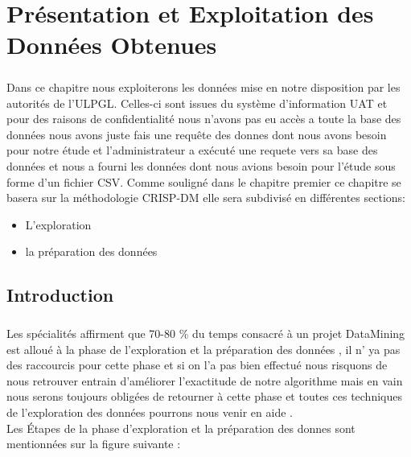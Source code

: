 \chapter{Présentation et Exploitation des Données Obtenues}
\paragraph{}
 Dans ce chapitre nous exploiterons  les données mise en notre
disposition par les autorités de l'\ac{ULPGL}. Celles-ci sont issues du
système d'information \ac{UAT}  et pour des
raisons de confidentialité nous n'avons pas eu accès a toute la base des
données nous avons juste fais une requête des donnes dont nous avons
besoin pour notre étude et l'administrateur a exécuté une requete vers
sa base des données et nous a fourni les données dont nous avions besoin
pour l'étude sous forme d'un fichier \ac {CSV}. Comme
souligné dans le chapitre premier ce chapitre se basera sur la
méthodologie \ac{CRISP-DM} elle sera subdivisé en différentes sections:
\begin{itemize}
	\item L'exploration 
	\item la préparation des données \cite{bookSckit-Learn}
\end{itemize}


    \section{Introduction}
\paragraph{}
Les spécialités affirment que 70-80 \% du temps consacré à un projet
DataMining est alloué à la phase de l'exploration et la préparation des
données \cite{DataExpAV} , il n' ya pas des raccourcis pour cette phase et si on l'a pas
bien effectué nous risquons de nous retrouver entrain d'améliorer
l'exactitude de notre algorithme mais en vain nous serons toujours
obligées de retourner à cette phase et toutes ces techniques de
l'exploration des données pourrons nous venir en aide .\\
Les Étapes de la phase d'exploration et la préparation des donnes sont mentionnées sur la figure suivante :
